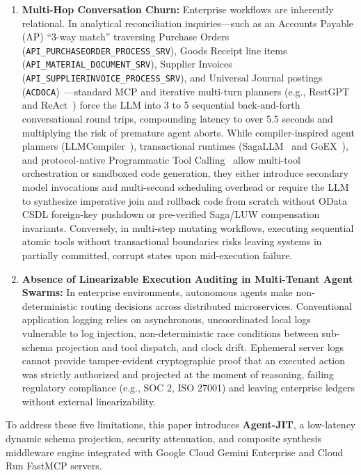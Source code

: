 \documentclass[conference,10pt]{IEEEtran}
\begin{document}
\begin{enumerate}
    \item \textbf{Multi-Hop Conversation Churn:} Enterprise workflows are inherently relational. In analytical reconciliation inquiries—such as an Accounts Payable (AP) ``3-way match'' traversing Purchase Orders (\texttt{API\_PURCHASEORDER\_PROCESS\_SRV}), Goods Receipt line items (\texttt{API\_MATERIAL\_DOCUMENT\_SRV}), Supplier Invoices (\texttt{API\_SUPPLIERINVOICE\_PROCESS\_SRV}), and Universal Journal postings (\texttt{ACDOCA})~\cite{pizzo2020odata}—standard MCP and iterative multi-turn planners (e.g., RestGPT~\cite{song2023restgpt} and ReAct~\cite{yao2023react}) force the LLM into 3 to 5 sequential back-and-forth conversational round trips, compounding latency to over 5.5 seconds and multiplying the risk of premature agent aborts. While compiler-inspired agent planners (LLMCompiler~\cite{kim2024llmcompiler}), transactional runtimes (SagaLLM~\cite{geng2025sagallm} and GoEX~\cite{patil2024goex}), and protocol-native Programmatic Tool Calling~\cite{anthropic2024mcp} allow multi-tool orchestration or sandboxed code generation, they either introduce secondary model invocations and multi-second scheduling overhead or require the LLM to synthesize imperative join and rollback code from scratch without OData CSDL foreign-key pushdown or pre-verified Saga/LUW compensation invariants. Conversely, in multi-step mutating workflows, executing sequential atomic tools without transactional boundaries risks leaving systems in partially committed, corrupt states upon mid-execution failure.
    \item \textbf{Absence of Linearizable Execution Auditing in Multi-Tenant Agent Swarms:} In enterprise environments, autonomous agents make non-deterministic routing decisions across distributed microservices. Conventional application logging relies on asynchronous, uncoordinated local logs vulnerable to log injection, non-deterministic race conditions between sub-schema projection and tool dispatch, and clock drift. Ephemeral server logs cannot provide tamper-evident cryptographic proof that an executed action was strictly authorized and projected at the moment of reasoning, failing regulatory compliance (e.g., SOC 2, ISO 27001) and leaving enterprise ledgers without external linearizability.
\end{enumerate}

To address these five limitations, this paper introduces \textbf{Agent-JIT}, a low-latency dynamic schema projection, security attenuation, and composite synthesis middleware engine integrated with Google Cloud Gemini Enterprise and Cloud Run FastMCP servers. 
\end{document}
